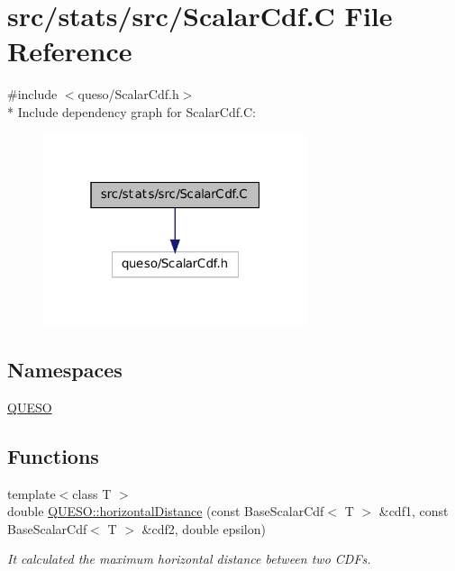 \hypertarget{_scalar_cdf_8_c}{\section{src/stats/src/\-Scalar\-Cdf.C File Reference}
\label{_scalar_cdf_8_c}
}
{\ttfamily \#include $<$queso/\-Scalar\-Cdf.\-h$>$}\\*
Include dependency graph for Scalar\-Cdf.\-C\-:
\nopagebreak
\begin{figure}[H]
\begin{center}
\leavevmode
\includegraphics[width=220pt]{_scalar_cdf_8_c__incl}
\end{center}
\end{figure}
\subsection*{Namespaces}
\begin{DoxyCompactItemize}
\item 
\hyperlink{namespace_q_u_e_s_o}{Q\-U\-E\-S\-O}
\end{DoxyCompactItemize}
\subsection*{Functions}
\begin{DoxyCompactItemize}
\item 
{\footnotesize template$<$class T $>$ }\\double \hyperlink{namespace_q_u_e_s_o_a389e9373827829b35f2bf36df32d0ef1}{Q\-U\-E\-S\-O\-::horizontal\-Distance} (const Base\-Scalar\-Cdf$<$ T $>$ \&cdf1, const Base\-Scalar\-Cdf$<$ T $>$ \&cdf2, double epsilon)
\begin{DoxyCompactList}\small\item\em It calculated the maximum horizontal distance between two C\-D\-Fs. \end{DoxyCompactList}\end{DoxyCompactItemize}
